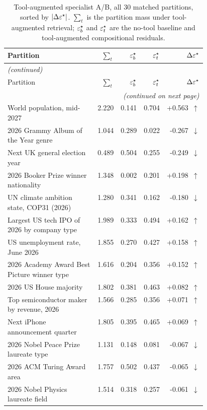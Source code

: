 \begin{longtable}{p{0.46\linewidth} r r r r}
\caption{Tool-augmented specialist A/B, all $30$ matched partitions, sorted by $|\Delta\varepsilon^\star|$. $\sum_t$ is the partition mass under tool-augmented retrieval; $\varepsilon^\star_b$ and $\varepsilon^\star_t$ are the no-tool baseline and tool-augmented compositional residuals.}\label{tab:toolaug}\\
\toprule
Partition & $\sum_t$ & $\varepsilon^\star_b$ & $\varepsilon^\star_t$ & $\Delta\varepsilon^\star$ \\
\midrule
\endfirsthead
\multicolumn{5}{l}{\small \emph{(continued)}}\\
\toprule
Partition & $\sum_t$ & $\varepsilon^\star_b$ & $\varepsilon^\star_t$ & $\Delta\varepsilon^\star$ \\
\midrule
\endhead
\midrule
\multicolumn{5}{r}{\small \emph{(continued on next page)}}\\
\endfoot
\bottomrule
\endlastfoot
World population, mid-2027 & 2.220 & 0.141 & 0.704 & +0.563~$\uparrow$ \\
2026 Grammy Album of the Year genre & 1.044 & 0.289 & 0.022 & -0.267~$\downarrow$ \\
Next UK general election year & 0.489 & 0.504 & 0.255 & -0.249~$\downarrow$ \\
2026 Booker Prize winner nationality & 1.348 & 0.002 & 0.201 & +0.198~$\uparrow$ \\
UN climate ambition state, COP31 (2026) & 1.280 & 0.341 & 0.162 & -0.180~$\downarrow$ \\
Largest US tech IPO of 2026 by company type & 1.989 & 0.333 & 0.494 & +0.162~$\uparrow$ \\
US unemployment rate, June 2026 & 1.855 & 0.270 & 0.427 & +0.158~$\uparrow$ \\
2026 Academy Award Best Picture winner type & 1.616 & 0.204 & 0.356 & +0.152~$\uparrow$ \\
2026 US House majority & 1.802 & 0.381 & 0.463 & +0.082~$\uparrow$ \\
Top semiconductor maker by revenue, 2026 & 1.566 & 0.285 & 0.356 & +0.071~$\uparrow$ \\
Next iPhone announcement quarter & 1.805 & 0.395 & 0.465 & +0.069~$\uparrow$ \\
2026 Nobel Peace Prize laureate type & 1.131 & 0.148 & 0.081 & -0.067~$\downarrow$ \\
2026 ACM Turing Award area & 1.757 & 0.502 & 0.437 & -0.065~$\downarrow$ \\
2026 Nobel Physics laureate field & 1.514 & 0.318 & 0.257 & -0.061~$\downarrow$ \\

\end{longtable}
